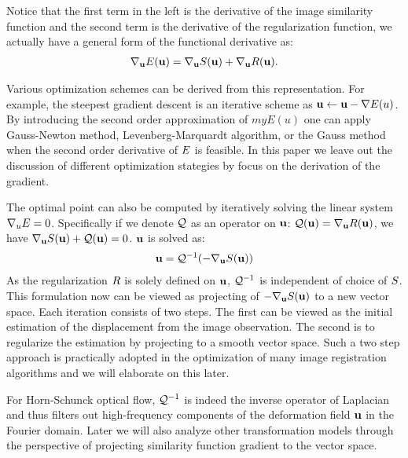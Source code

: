 \documentclass[letterpaper,12pt]{article}
\begin{document}
Notice that the first term in the left is the derivative of the image similarity function and the second term is the derivative of the regularization function, we actually have a general form of the functional derivative as:
\begin{align}
\nabla_{\mathbf{u}} E(\mathbf{u}) = \nabla_{\mathbf{u}} S(\mathbf{u}) + \nabla_{\mathbf{u}} R(\mathbf{u}).
\end{align}


Various optimization schemes can be derived from this representation. For example, the steepest gradient descent is an iterative scheme as $\mathbf{u} \leftarrow \mathbf{u} - \nabla E(u)$. By introducing the second order approximation of $myE(u)$ one can apply Gauss-Newton method, Levenberg-Marquardt algorithm, or the Gauss method when the second order derivative of $E$ is feasible. In this paper we leave out the discussion of different optimization stategies by focus on the derivation of the gradient.

The optimal point can also be computed by iteratively solving the linear system $\nabla_u E = 0$. 
Specifically if we denote $\mathcal{Q}$ as an operator on $\mathbf{u}$: $\mathcal{Q}(\mathbf{u}) = \nabla_{\mathbf{u}} R(\mathbf{u})$, we have $\nabla_{\mathbf{u}} S(\mathbf{u}) + \mathcal{Q}(\mathbf{u}) = 0$. $\mathbf{u}$ is solved as: 
\begin{align}
\mathbf{u} = \mathcal{Q}^{-1}(-\nabla_{\mathbf{u}} S(\mathbf{u}))
\label{eq:projection}
\end{align}
As the regularization $R$ is solely defined on $\mathbf{u}$, $\mathcal{Q}^{-1}$ is independent of choice of $S$. This formulation now can be viewed as projecting of $-\nabla_{\mathbf{u}} S(\mathbf{u})$ to a new vector space. Each iteration consists of two steps. The first can be viewed as the initial estimation of the displacement from the image observation. The second is to regularize the estimation by projecting to a smooth vector space. Such a two step approach is practically adopted in the optimization of many image registration algorithms and we will elaborate on this later.

For Horn-Schunck optical flow, $\mathcal{Q}^{-1}$ is indeed the inverse operator of Laplacian and thus filters out high-frequency components of the deformation field $\mathbf{u}$ in the Fourier domain. Later we will also analyze other transformation models through the perspective of projecting similarity function gradient to the vector space.	
\end{document}
